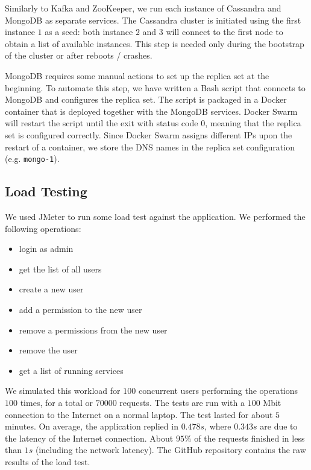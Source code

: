 Similarly to Kafka and ZooKeeper, we run each instance of Cassandra and MongoDB as separate services.
The Cassandra cluster is initiated using the first instance $1$ as a seed: both instance $2$ and $3$ will connect to the first node to obtain a list of available instances.
This step is needed only during the bootstrap of the cluster or after reboots / crashes.

MongoDB requires some manual actions to set up the replica set at the beginning.
To automate this step, we have written a Bash script that connects to MongoDB and configures the replica set.
The script is packaged in a Docker container that is deployed together with the MongoDB services.
Docker Swarm will restart the script until the exit with status code $0$, meaning that the replica set is configured correctly.
Since Docker Swarm assigns different IPs upon the restart of a container, we store the DNS names in the replica set configuration (e.g. \texttt{mongo-1}).

\subsection{Load Testing}
We used JMeter to run some load test against the application.
We performed the following operations:
\begin{itemize}
	\item login as admin
    \item get the list of all users
    \item create a new user
    \item add a permission to the new user
    \item remove a permissions from the new user
    \item remove the user
    \item get a list of running services
\end{itemize}

We simulated this workload for $100$ concurrent users performing the operations $100$ times, for a total or $70000$ requests.
The tests are run with a $100$ Mbit connection to the Internet on a normal laptop.
The test lasted for about $5$ minutes.
On average, the application replied in $0.478 s$, where $0.343 s$ are due to the latency of the Internet connection.
About $95\%$ of the requests finished in less than $1 s$ (including the network latency).
The GitHub repository contains the raw results of the load test.
